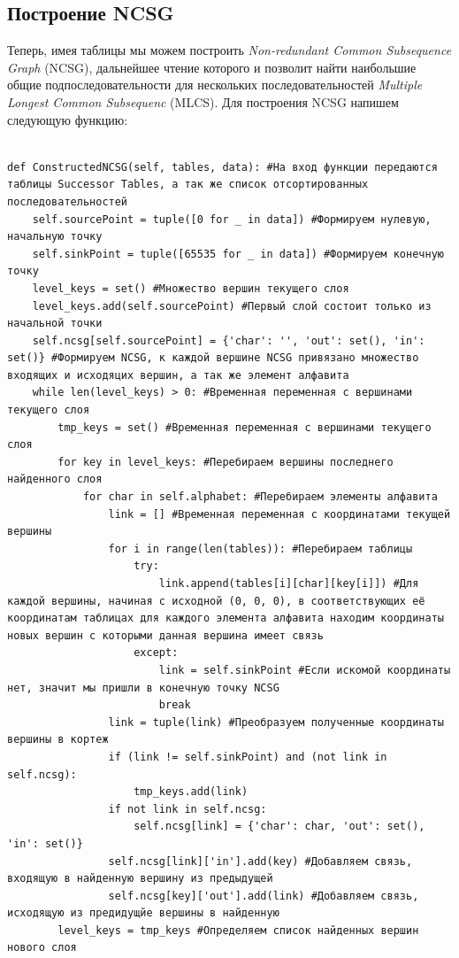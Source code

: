 \documentclass[a4paper,12pt]{extarticle}
\begin{document}
\subsection{Построение NCSG}

Теперь, имея таблицы мы можем построить \textit{Non-redundant Common Subsequence Graph} (NCSG), дальнейшее чтение которого и позволит найти наибольшие общие подпоследовательности для нескольких последовательностей \textit{Multiple Longest Common Subsequenc} (MLCS). Для построения NCSG напишем следующую функцию:

\begin{verbatim}

def ConstructedNCSG(self, tables, data): #На вход функции передаются таблицы Successor Tables, а так же список отсортированных последовательностей
    self.sourcePoint = tuple([0 for _ in data]) #Формируем нулевую, начальную точку
    self.sinkPoint = tuple([65535 for _ in data]) #Формируем конечную точку
    level_keys = set() #Множество вершин текущего слоя
    level_keys.add(self.sourcePoint) #Первый слой состоит только из начальной точки
    self.ncsg[self.sourcePoint] = {'char': '', 'out': set(), 'in': set()} #Формируем NCSG, к каждой вершине NCSG привязано множество входящих и исходяцих вершин, а так же элемент алфавита
    while len(level_keys) > 0: #Временная переменная с вершинами текущего слоя
        tmp_keys = set() #Временная переменная с вершинами текущего слоя
        for key in level_keys: #Перебираем вершины последнего найденного слоя
            for char in self.alphabet: #Перебираем элементы алфавита
                link = [] #Временная переменная с координатами текущей вершины
                for i in range(len(tables)): #Перебираем таблицы
                    try:
                        link.append(tables[i][char][key[i]]) #Для каждой вершины, начиная с исходной (0, 0, 0), в соответствующих её координатам таблицах для каждого элемента алфавита находим координаты новых вершин с которыми данная вершина имеет связь
                    except:
                        link = self.sinkPoint #Если искомой координаты нет, значит мы пришли в конечную точку NCSG
                        break
                link = tuple(link) #Преобразуем полученные координаты вершины в кортеж
                if (link != self.sinkPoint) and (not link in self.ncsg):
                    tmp_keys.add(link)
                if not link in self.ncsg:
                    self.ncsg[link] = {'char': char, 'out': set(), 'in': set()}
                self.ncsg[link]['in'].add(key) #Добавляем связь, входящую в найденную вершину из предыдущей
                self.ncsg[key]['out'].add(link) #Добавляем связь, исходящую из предидущйе вершины в найденную
        level_keys = tmp_keys #Определяем список найденных вершин нового слоя

\end{verbatim}
\end{document}
